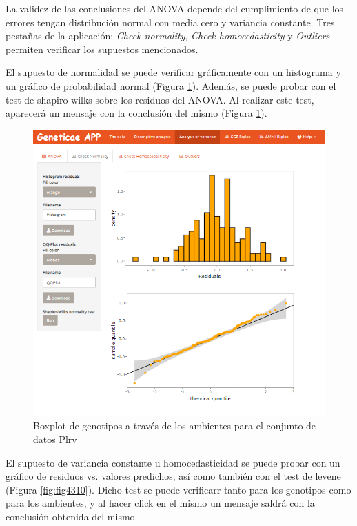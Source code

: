 La validez de las conclusiones del ANOVA depende del cumplimiento de que los errores tengan distribución normal con media cero y variancia constante. Tres pestañas de la aplicación: \emph{Check normality}, \emph{Check homocedasticity} y \emph{Outliers} permiten verificar los supuestos mencionados.

El supuesto de normalidad se puede verificar gráficamente con un histograma y un gráfico de probabilidad normal (Figura \ref{fig:fig439}). Además, se puede probar con el test de shapiro-wilks sobre los residuos del ANOVA. Al realizar este test, aparecerá un mensaje con la conclusión del mismo (Figura \ref{fig:fig439}). 

\begin{figure}[H]
	\begin{center}
		\includegraphics[width=16cm]{./Graficos/Normalidad.png}
	\end{center}
	\caption{Boxplot de genotipos a través de los ambientes para el conjunto de datos Plrv}
	\label{fig:fig439}
\end{figure}


El supuesto de variancia constante u homocedasticidad se puede probar con un gráfico de residuos vs. valores predichos, así como también con el test de levene (Figura \ref{fig:fig4310}). Dicho test se puede verificarr tanto para los genotipos como para los ambientes, y al hacer click en el mismo un mensaje saldrá con la conclusión obtenida del mismo.

